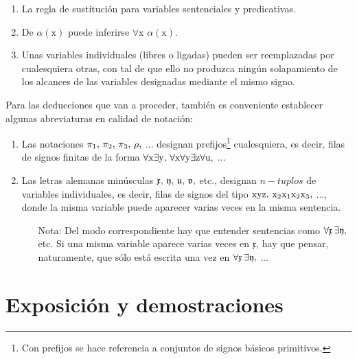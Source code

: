 \begin{itemize}
\begin{enumerate}
                \item La regla de sustitución para variables sentenciales y predicativas.
                \item De $\alpha(\text{x})$ puede inferirse $\forall \text{x } \alpha(\text{x})$.
                \item Unas variables individuales (libres o ligadas) pueden ser reemplazadas por cualesquiera otras, con tal de que 
                        ello no produzca ningún solapamiento de los alcances de las variables designadas mediante el mismo signo.
            \end{enumerate}
\end{itemize}

Para las deducciones que van a proceder, también es conveniente establecer algunas abreviaturas en calidad de notación:
\begin{enumerate}
    \item Las notaciones $\pi_1, \thinspace \pi_2, \thinspace \pi_3, \thinspace \rho, $ ... designan prefijos\footnote{Con prefijos 
    se hace referencia a conjuntos de signos básicos primitivos.} cualesquiera, es decir, filas de signos
            finitas de la forma $\forall \text{x} \exists \text{y}, \thinspace \forall \text{x} \forall \text{y} \exists \text{z} \forall \text{u},$ ...
    \item Las letras alemanas minúsculas $\mathfrak{x, \thinspace y, \thinspace u, \thinspace v,} $ etc., designan $n-tuplos$ de variables
            individuales, es decir, filas de signos del tipo $\text{xyz}, \thinspace \text{x}_2\text{x}_1\text{x}_2\text{x}_3,$ ..., 
            donde la misma variable puede aparecer varias veces en la misma sentencia.
            \begin{itemize}
                \item[Nota:] Del modo correspondiente hay que entender sentencias como $\forall \mathfrak{x} \thinspace \exists \mathfrak{y},$ etc. 
                            Si una misma variable aparece varias veces en $\mathfrak{x}$, hay que pensar, naturamente, que sólo está escrita una vez
                            en $\forall \mathfrak{x} \thinspace \exists \mathfrak{y},$ ...
            \end{itemize}
\end{enumerate}


\section{Exposición y demostraciones}


